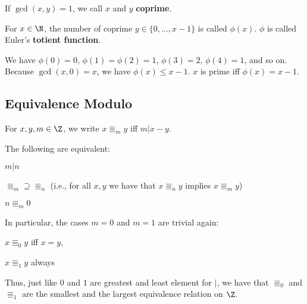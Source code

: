 \begin{definition}
If $\gcd(x,y)=1$, we call $x$ and $y$ \textbf{coprime}.

For $x\in\N$, the number of coprime $y\in\{0,\ldots,x-1\}$ is called $\phi(x)$.
$\phi$ is called Euler's \textbf{totient function}.
\end{definition}

\begin{example}
We have $\phi(0)=0$, $\phi(1)=\phi(2)=1$, $\phi(3)=2$, $\phi(4)=1$, and so on.
Because $\gcd(x,0)=x$, we have $\phi(x)\leq x-1$.
$x$ is prime iff $\phi(x)=x-1$.
\end{example}

\subsection{Equivalence Modulo}\label{sec:math:modulo}

\begin{definition}\label{def:math:modulo}
 For $x,y,m\in\Z$, we write $x\Equiv_m y$ iff $m|x-y$.
\end{definition}

\begin{theorem}
The following are equivalent:
\begin{compactitem}
\item $m|n$
\item $\Equiv_m\supseteq \Equiv_n$ (i.e., for all $x,y$ we have that $x\Equiv_n y$ implies $x\Equiv_m y$)
\item $n\Equiv_m 0$
\end{compactitem}
\end{theorem}

\begin{remark}
In particular, the cases $m=0$ and $m=1$ are trivial again:
\begin{compactitem}
\item $x\Equiv_0 y$ iff $x=y$,
\item $x\Equiv_1 y$ always
\end{compactitem}

Thus, just like $0$ and $1$ are greatest and least element for $|$, we have that $\Equiv_0$ and $\Equiv_1$ are the smallest and the largest equivalence relation on $\Z$.
\end{remark}


